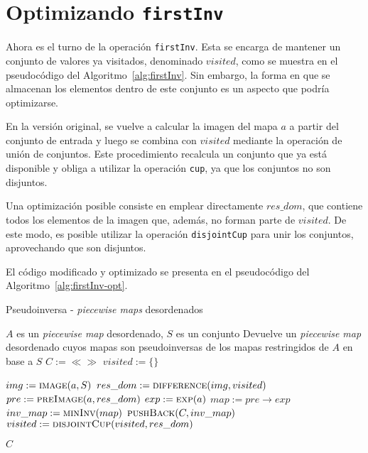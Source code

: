 \section{Optimizando \texttt{firstInv}}

Ahora es el turno de la operación \texttt{firstInv}.  
Esta se encarga de mantener un conjunto de valores ya visitados, denominado $visited$, como se muestra en el pseudocódigo del Algoritmo~\ref{alg:firstInv}.  
Sin embargo, la forma en que se almacenan los elementos dentro de este conjunto es un aspecto que podría optimizarse.

En la versión original, se vuelve a calcular la imagen del mapa $a$ a partir del conjunto de entrada y luego se combina con $visited$ mediante la operación de unión de conjuntos. Este procedimiento recalcula un conjunto que ya está disponible y obliga a utilizar la operación \texttt{cup}, ya que los conjuntos no son disjuntos.

Una optimización posible consiste en emplear directamente $res\_dom$, que contiene todos los elementos de la imagen que, además, no forman parte de $visited$.  
De este modo, es posible utilizar la operación \texttt{disjointCup} para unir los conjuntos, aprovechando que son disjuntos.

El código modificado y optimizado se presenta en el pseudocódigo del Algoritmo~\ref{alg:firstInv-opt}.




\begin{algorithm}
\caption{Pseudoinversa - \textit{piecewise maps} desordenados}
\label{alg:firstInv-opt}
\begin{algorithmic}[1]
\Require $A$ es un \textit{piecewise map} desordenado, $S$ es un conjunto
\Ensure Devuelve un \textit{piecewise map} desordenado cuyos mapas son pseudoinversas de los mapas restringidos de $A$ en base a $S$
  \State $C :=\ll\gg$
  \State $visited := \{\}$

    \State $img := \Call{image}{a, S}$
    \State $res\_dom := \Call{difference}{img, visited}$
      \State $pre := \Call{preImage}{a, res\_dom}$
      \State $exp := \Call{exp}{a}$
      \State $map := pre \rightarrow exp$
      \State $inv\_map := \Call{minInv}{map}$
      \State $\Call{pushBack}{C, inv\_map}$
      \State $visited := \Call{disjointCup}{visited, res\_dom}$
    \EndIf
  \EndFor

  \State \Return $C$
\EndFunction
\end{algorithmic}
\end{algorithm}